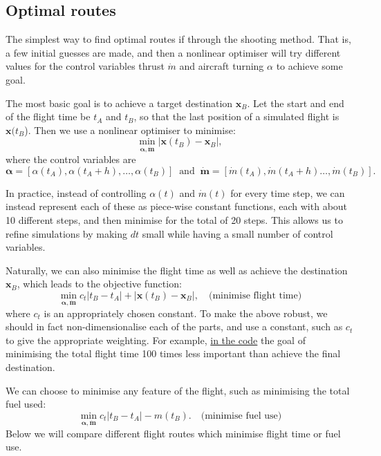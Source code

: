 \documentclass{article}
\renewcommand{\vec}[1]{\boldsymbol{#1}}
\begin{document}


\subsection{Optimal routes}

The simplest way to find optimal routes if through the shooting method. That is, a few initial guesses are made, and then a nonlinear optimiser will try different values for the control variables thrust $\dot m$ and aircraft turning $\alpha$ to achieve some goal. 

The most basic goal is to achieve a target destination $\vec x_B$. Let the start and end of the flight time be $t_A$ and $t_B$, so that the last position of a simulated flight is $\vec x(t_B$). Then we use a nonlinear optimiser to minimise:
\[
\min_{\vec \alpha, \dot{\vec m}} | \vec x(t_B) - \vec x_B|,
\]
where the control variables are
\[
\vec \alpha = [\alpha(t_A), \alpha(t_A+h), \ldots, \alpha(t_B)] \;\; \text{and} \;\; 
\dot{\vec m} = [\dot m(t_A), \dot m(t_A+h) \ldots, \dot m(t_B)].
\]

In practice, instead of controlling $\alpha(t)$ and $\dot m(t)$ for every time step, we can instead represent each of these as piece-wise constant functions, each with about 10 different steps, and then minimise for the total of 20 steps. This allows us to refine simulations by making $dt$ small while having a small number of control variables.

Naturally, we can also minimise the flight time as well as achieve the destination $\vec x_B$, which leads to the objective function:
\begin{equation} \label{eqn:objective-flight-time}
    \min_{\vec \alpha, \dot{\vec m}} c_t | t_B - t_A| + | \vec x(t_B) - \vec x_B|, \quad \text{(minimise flight time)}
\end{equation}
where $c_t$ is an appropriately chosen constant. To make the above robust, we should in fact non-dimensionalise each of the parts, and use a constant, such as $c_t$ to give the appropriate weighting. For example, \href{https://github.com/arturgower/AircraftRouteDynamics.jl/blob/354db5b80cef8d20cd8fcf031ec3f446823477eb/src/equations-motion.jl#L168}{in the code} the goal of minimising the total flight time 100 times less important than achieve the final destination.

We can choose to minimise any feature of the flight, such as minimising the total fuel used:
\begin{equation} \label{eqn:objective-fuel-use}
    \min_{\vec \alpha, \dot{\vec m}} c_t | t_B - t_A| - m(t_B). \quad \text{(minimise fuel use)}
\end{equation}
Below we will compare different flight routes which minimise flight time or fuel use.
\end{document}
